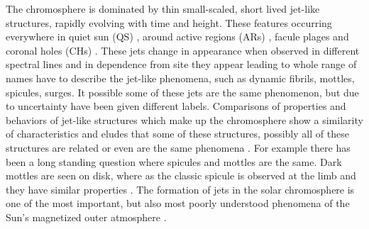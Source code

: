 \documentclass[12pt]{ociamthesis}
\begin{document}
The chromosphere is dominated by thin small-scaled, short lived  jet-like structures, rapidly evolving with time and height. These features occurring everywhere in quiet sun (QS) \citep{Pontieu2007astroph2081D,Rouppe2007ApJ660L169R,Pereira2012,Pereira2014ApJ}, around active regions (ARs) \citep{Pontieu2007astroph2081D,Pereira2012,Rouppe2013ApJ77656R,Gafeira2017ApJS2296G}, facule plages and coronal holes (CHs) \citep{Yamauchi2005ApJ629572Y,Moreno2008ApJ673L211M,Pereira2012,Young2015ApJ801124Y}. These jets change in appearance when observed in different spectral lines and in dependence from site they appear leading to whole range of names have to describe the jet-like phenomena, such as dynamic fibrils, mottles, spicules, surges. It possible some of these jets are the same phenomenon, but due to uncertainty have been given different labels. Comparisons of properties and behaviors of jet-like structures which make up the chromosphere show a similarity of characteristics and eludes that some of these structures, possibly all of these structures are related or even are the same phenomena \cite{Porfir2016A}. For example there has been a long standing question where spicules and mottles are the same. Dark mottles are seen on disk, where as the classic spicule is observed at the limb and they have similar properties \cite{Pontieu2007ASPC}. The formation of jets in the solar chromosphere is one of the most important, but also most poorly understood phenomena of the Sun's magnetized outer atmosphere \citep{Hansteen2006ApJ}. 
\end{document}
